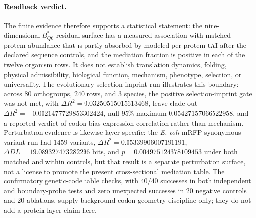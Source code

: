 \paragraph{Readback verdict.}
The finite evidence therefore supports a statistical statement: the nine-dimensional $B^{*}_{Q6}$ residual surface has a measured association with matched protein abundance that is partly absorbed by modeled per-protein tAI after the declared sequence controls, and the mediation fraction is positive in each of the twelve organism rows.  It does not establish translation dynamics, folding, physical admissibility, biological function, mechanism, phenotype, selection, or universality.  The evolutionary-selection imprint run illustrates this boundary: across $80$ orthogroups, $240$ rows, and $3$ species, the positive selection-imprint gate was not met, with $\Delta R^2=0.03250515015613468$, leave-clade-out $\Delta R^2=-0.0021477729853302424$, null $95\%$ maximum $0.05427157066522958$, and a reported verdict of codon-bias expression correlation rather than mechanism.  Perturbation evidence is likewise layer-specific: the \textit{E. coli} mRFP synonymous-variant run had $1459$ variants, $\Delta R^2=0.05339906007191191$, $\Delta DL=19.089327473282296$ bits, and $p=0.004975124378109453$ under both matched and within controls, but that result is a separate perturbation surface, not a license to promote the present cross-sectional mediation table.  The confirmatory genetic-code table checks, with $40/40$ successes in both independent and boundary-probe tests and zero unexpected successes in $20$ negative controls and $20$ ablations, supply background codon-geometry discipline only; they do not add a protein-layer claim here.
